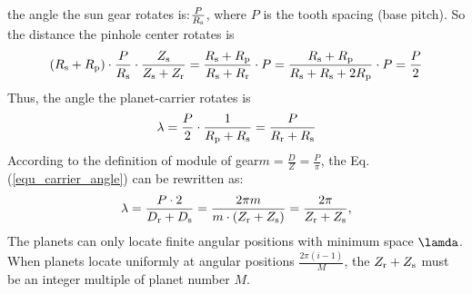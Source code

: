 \documentclass[a4paper,fleqn]{cas-sc}%
\begin{document}
the angle the sun gear rotates is:$\frac{P}{R_{\rm s}}$, where $P$ is the tooth spacing (base pitch). So the distance the pinhole center rotates is
\begin{equation}
    (R_{\rm s}+R_{\rm p}) \cdot \frac{P}{R_{\rm s}} \cdot \frac{Z_{\rm s}}{Z_{\rm s}+Z_{\rm r}}
    =\frac{R_{\rm s}+R_{\rm p}}{R_{\rm s}+R_{\rm r}} \cdot P
    =\frac{R_{\rm s}+R_{\rm p}}{R_{\rm s}+R_{\rm s}+2R_{\rm p}} \cdot P
    =\frac{P}{2}
\end{equation}
Thus, the angle the planet-carrier rotates is
\begin{equation}
    \lambda=\frac{P}{2} \cdot \frac{1}{R_{\rm p}+R_{\rm s}}
    =\frac{P}{R_{\rm r}+R_{\rm s}}
    \label{equ_carrier_angle}
\end{equation}
According to the definition of module of gear$m=\frac{D}{Z}=\frac{P}{\pi}$, the Eq. (\ref{equ_carrier_angle}) can be rewritten as:
\begin{equation}
    \lambda=\frac{P \cdot 2}{D_{\rm r}+D_{\rm s}}
    =\frac{2 \pi m}{m \cdot ({Z_{\rm r}}+Z_{\rm s})}
    =\frac{2 \pi}{Z_{\rm r}+Z_{\rm s}},
\end{equation}
The planets can only locate finite angular positions with minimum space $\lamda$. When planets locate uniformly at angular positions $\frac{2\pi(i-1)}{M}$, the $Z_{\rm r}+Z_{\rm s}$ must be an integer multiple of planet number $M$.


\end{document}
